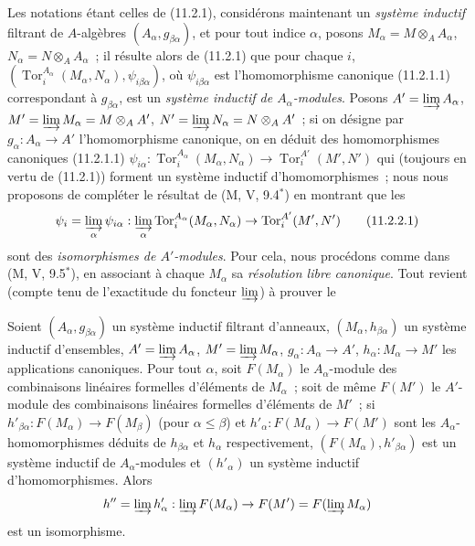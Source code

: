 \begin{env}[11.2.2]
\label{IV.11.2.2-fr}
Les notations étant celles de (11.2.1), considérons maintenant un
\emph{système inductif} filtrant de $A$-algèbres
$(A_\alpha,g_{\beta\alpha})$, et pour tout indice $\alpha$, posons
$M_\alpha=M\otimes_AA_\alpha$, $N_\alpha=N\otimes_AA_\alpha$~; il résulte
alors de (11.2.1) que pour chaque $i$,
$(\operatorname{Tor}_i^{A_\alpha}(M_\alpha,N_\alpha),
\psi_{i\beta\alpha})$, où $\psi_{i\beta\alpha}$ est l'homomorphisme
canonique (11.2.1.1) correspondant à $g_{\beta\alpha}$, est un \emph{système
inductif de $A_\alpha$-modules}. Posons
$A'=\varinjlim A_\alpha$, $M'=\varinjlim M_\alpha=M\otimes_AA'$,
$N'=\varinjlim N_\alpha=N\otimes_AA'$~; si on désigne par
$g_\alpha:A_\alpha\to A'$ l'homomorphisme canonique, on en déduit des
homomorphismes canoniques (11.2.1.1)
$\psi_{i\alpha}:\operatorname{Tor}_i^{A_\alpha}(M_\alpha,N_\alpha)
\to\operatorname{Tor}_i^{A'}(M',N')$ qui (toujours en vertu de (11.2.1))
forment un système inductif d'homomorphismes~; nous nous proposons de
compléter le résultat de (M, V, 9.4$^*$) en montrant que les
\begin{equation}
\psi_i=\varinjlim_\alpha\psi_{i\alpha}:
\varinjlim_\alpha\operatorname{Tor}_i^{A_\alpha}(M_\alpha,N_\alpha)
\to\operatorname{Tor}_i^{A'}(M',N')
\label{IV.11.2.2.1-fr}
\tag{11.2.2.1}
\end{equation}
sont des \emph{isomorphismes de $A'$-modules}. Pour cela, nous procédons
comme dans (M, V, 9.5$^*$), en associant à chaque $M_\alpha$ sa
\emph{résolution libre canonique}. Tout revient (compte tenu de l'exactitude
du foncteur $\varinjlim$) à prouver le
\end{env}

\begin{lemma}[11.2.2.2]
\label{IV.11.2.2.2-fr}
Soient $(A_\alpha,g_{\beta\alpha})$ un système inductif filtrant d'anneaux,
$(M_\alpha,h_{\beta\alpha})$ un système inductif d'ensembles,
$A'=\varinjlim A_\alpha$, $M'=\varinjlim M_\alpha$,
$g_\alpha:A_\alpha\to A'$, $h_\alpha:M_\alpha\to M'$ les applications
canoniques. Pour tout $\alpha$, soit $F(M_\alpha)$ le $A_\alpha$-module des
combinaisons linéaires formelles d'éléments de $M_\alpha$~; soit de même
$F(M')$ le $A'$-module des combinaisons linéaires formelles d'éléments de
$M'$~; si $h'_{\beta\alpha}:F(M_\alpha)\to F(M_\beta)$ (pour
$\alpha\leq\beta$) et $h'_\alpha:F(M_\alpha)\to F(M')$ sont les
$A_\alpha$-homomorphismes déduits de $h_{\beta\alpha}$ et $h_\alpha$
respectivement, $(F(M_\alpha),h'_{\beta\alpha})$ est un système inductif
de $A_\alpha$-modules et $(h'_\alpha)$ un système inductif
d'homomorphismes. Alors
\[
h''=\varinjlim h'_\alpha:\varinjlim F(M_\alpha)\to
F(M')=F(\varinjlim M_\alpha)
\]
est un isomorphisme.
\end{lemma}

